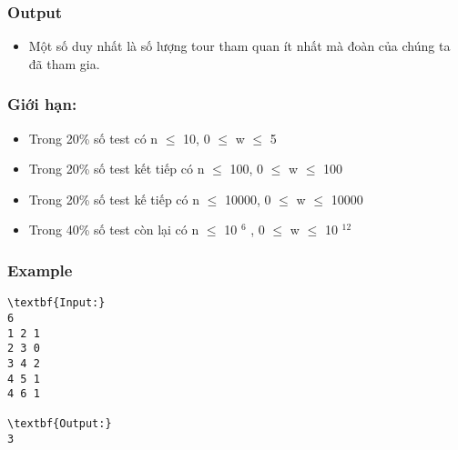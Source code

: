 \subsubsection{Output}
\begin{itemize}
	\item Một số duy nhất là số lượng tour tham quan ít nhất mà đoàn của chúng ta đã tham gia.
\end{itemize}

\subsubsection{Giới hạn:}
\begin{itemize}
	\item Trong 20\% số test có n  $\le$  10, 0  $\le$  w  $\le$  5
	\item Trong 20\% số test kết tiếp có n  $\le$  100, 0  $\le$  w  $\le$  100
	\item Trong 20\% số test kế tiếp có n  $\le$  10000, 0  $\le$  w  $\le$  10000
	\item Trong 40\% số test còn lại có n  $\le$  10 $^ 6 $ , 0  $\le$  w  $\le$  10 $^ 12 $
\end{itemize}

\subsubsection{Example}
\begin{verbatim}
\textbf{Input:}
6
1 2 1
2 3 0
3 4 2
4 5 1
4 6 1

\textbf{Output:}
3\end{verbatim}
